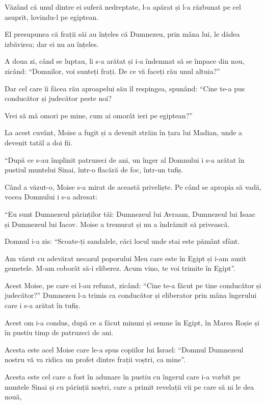 {Văzând că unul dintre ei suferă nedreptate, l-a apărat și l-a răzbunat pe cel asuprit, lovindu-l pe egiptean.

El presupunea că frații săi au înțeles că Dumnezeu, prin mâna lui, le dădea izbăvirea; dar ei nu au înțeles.


\par }{\PP {}A doua zi, când se luptau, li s-a arătat și i-a îndemnat să se împace din nou, zicând: “Domnilor, voi sunteți frați. De ce vă faceți rău unul altuia?”

Dar cel care îi făcea rău aproapelui său îl respingea, spunând: “Cine te-a pus conducător și judecător peste noi?

Vrei să mă omori pe mine, cum ai omorât ieri pe egiptean?”

La acest cuvânt, Moise a fugit și a devenit străin în țara lui Madian, unde a devenit tatăl a doi fii.


\par }{\PP {}“După ce s-au împlinit patruzeci de ani, un înger al Domnului i s-a arătat în pustiul muntelui Sinai, într-o flacără de foc, într-un tufiș.

Când a văzut-o, Moise s-a mirat de această priveliște. Pe când se apropia să vadă, vocea Domnului i s-a adresat:

“Eu sunt Dumnezeul părinților tăi: Dumnezeul lui Avraam, Dumnezeul lui Isaac și Dumnezeul lui Iacov. Moise a tremurat și nu a îndrăznit să privească.

Domnul i-a zis: “Scoate-ți sandalele, căci locul unde stai este pământ sfânt.

Am văzut cu adevărat necazul poporului Meu care este în Egipt și i-am auzit gemetele. M-am coborât să-i eliberez. Acum vino, te voi trimite în Egipt”.


\par }{\PP {}Acest Moise, pe care ei l-au refuzat, zicând: “Cine te-a făcut pe tine conducător și judecător?” Dumnezeu l-a trimis ca conducător și eliberator prin mâna îngerului care i s-a arătat în tufiș.

Acest om i-a condus, după ce a făcut minuni și semne în Egipt, în Marea Roșie și în pustiu timp de patruzeci de ani.

Acesta este acel Moise care le-a spus copiilor lui Israel: “Domnul Dumnezeul nostru vă va ridica un profet dintre frații voștri, ca mine”.

Acesta este cel care a fost în adunare în pustiu cu îngerul care i-a vorbit pe muntele Sinai și cu părinții noștri, care a primit revelații vii pe care să ni le dea nouă,

}
